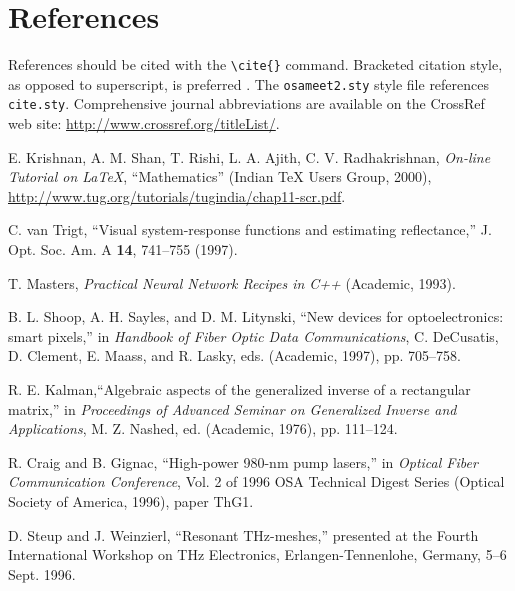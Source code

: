 \documentclass[letterpaper,10pt]{article}
\begin{document}
\section{References}
References should be cited with the \verb+\cite{}+ command.
Bracketed citation style, as opposed to superscript, is preferred
\cite{krishnan00,vantrigt97,masters93,shoop97,kalman76,craig96,steup96}.
The \texttt{osameet2.sty} style file references \texttt{cite.sty}. Comprehensive journal abbreviations are available on the CrossRef web site:
\href{http://www.crossref.org/titleList/}{http://www.crossref.org/titleList/}.

\begin{thebibliography}{99}

 E. Krishnan, A. M. Shan, T. Rishi, L. A. Ajith, C. V.
Radhakrishnan, \textit{On-line Tutorial on \LaTeX{}},
``Mathematics'' (Indian \TeX{} Users Group, 2000), \\
\url{http://www.tug.org/tutorials/tugindia/chap11-scr.pdf}.

 C. van Trigt, ``Visual system-response functions and estimating reflectance,''
J. Opt. Soc. Am. A \textbf{14}, 741--755 (1997).

 T. Masters, \emph{Practical Neural Network Recipes in C++} (Academic, 1993).

 B. L. Shoop, A. H. Sayles, and D. M. Litynski, ``New devices for optoelectronics: smart pixels,''
in \emph{Handbook of Fiber Optic Data Communications},
C. DeCusatis, D. Clement, E. Maass, and R. Lasky, eds. (Academic, 1997), pp. 705--758.

 R. E. Kalman,``Algebraic aspects of the generalized inverse of a rectangular matrix,'' in
\emph{Proceedings of Advanced Seminar on Generalized Inverse and Applications}, M. Z. Nashed, ed. (Academic, 1976), pp. 111--124.

 R. Craig and B. Gignac, ``High-power 980-nm pump lasers,''
in \emph{Optical Fiber Communication Conference}, Vol. 2 of 1996 OSA Technical Digest Series (Optical Society of America, 1996), paper ThG1.

 D. Steup and J. Weinzierl, ``Resonant THz-meshes,''
presented at the Fourth International Workshop on THz Electronics, Erlangen-Tennenlohe, Germany, 5--6 Sept. 1996.

\end{thebibliography}
\end{document}
